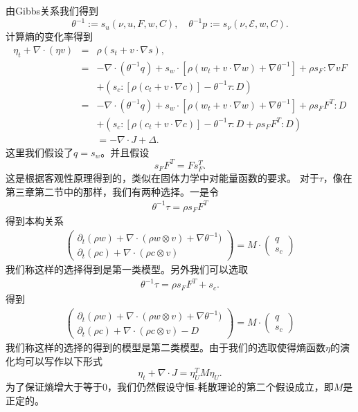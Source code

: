 \documentclass{article}
\begin{document}
由Gibbs关系我们得到
$$\theta^{-1}:=s_{u} (\nu,u,F, w,C), \quad \theta^{-1} p := s_\nu (\nu,\mathcal{E},w,C).$$
计算熵的变化率得到
\begin{eqnarray*}
		\eta_t + \nabla \cdot (\eta v) &=& \rho (s_t + v \cdot \nabla s), \\
		&=& -\nabla \cdot (\theta^{-1} q) + s_w \cdot [\rho (w_t + v \cdot \nabla w) + \nabla \theta^{-1}] + \rho s_F : \nabla v F  \\
		&& + (s_c:[\rho (c_t + v \cdot \nabla c)] - \theta^{-1} \tau : D) \\
		&=& -\nabla \cdot (\theta^{-1} q) + s_w \cdot [\rho (w_t + v \cdot \nabla w)+\nabla \theta^{-1}] + \rho s_F F^T : D  \\
		&& + (s_c:[\rho (c_t + v \cdot \nabla c)] - \theta^{-1} \tau : D + \rho s_F F^T : D)  \\
		&& = -\nabla \cdot J + \Delta.
\end{eqnarray*}
这里我们假设了$q=s_w$。并且假设
\begin{equation}
	s_F F^T = F s_F^T.	
\end{equation}
这是根据客观性原理得到的\cite{}，类似在固体力学中对能量函数的要求。
对于$\tau$，像在第三章第二节中的那样，我们有两种选择。一是令
\begin{eqnarray*}
\theta^{-1} \tau = \rho s_F F^T 
\end{eqnarray*}
得到本构关系
\begin{eqnarray}\label{eq:finite1}
\left( \begin{array}{c} \partial_t (\rho w) + \nabla \cdot (\rho w \otimes v) + \nabla \theta^{-1}) \\
	\partial_t (\rho c) + \nabla \cdot (\rho c \otimes v) \end{array} \right)
=
M \cdot \left( \begin{array}{c} q \\ s_c \end{array} \right)
\end{eqnarray}
我们称这样的选择得到是第一类模型。另外我们可以选取
\begin{eqnarray*}
	\theta^{-1} \tau = \rho s_F F^T + s_c.
\end{eqnarray*}
得到
\begin{eqnarray}\label{eq:finite2}
\left( \begin{array}{c} \partial_t (\rho w) + \nabla \cdot (\rho w \otimes v) + \nabla \theta^{-1}) \\
	\partial_t (\rho c) + \nabla \cdot (\rho c \otimes v) - D \end{array} \right)
=
M \cdot \left( \begin{array}{c} q \\ s_c  \end{array} \right)
\end{eqnarray}
我们称这样的选择的得到的模型是第二类模型。由于我们的选取使得熵函数$\eta$的演化均可以写作以下形式
\begin{equation}\label{eq:entropypro}
	\eta_t + \nabla \cdot J = \eta_U^T M \eta_U.
\end{equation}
为了保证熵增大于等于$0$，我们仍然假设守恒-耗散理论的第二个假设成立，即$M$是正定的。
\end{document}
